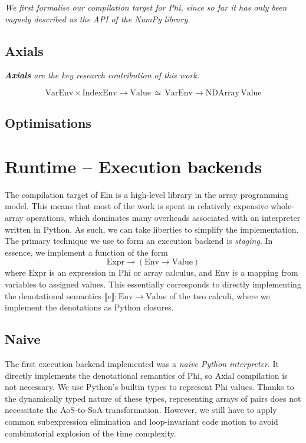 \textit{We first formalise our compilation target for Phi, since so far it has only been vaguely described as the API of the NumPy library.} \todothis

\subsection{Axials}

\textit{\textbf{Axials} are the key research contribution of this work.}

$$ \mathrm{VarEnv} \times \mathrm{IndexEnv} \to \mathrm{Value} \,\simeq\, \mathrm{VarEnv} \to \mathrm{NDArray}\, \mathrm{Value} $$

\todothis


\subsection{Optimisations}

\todothis

\section{Runtime -- Execution backends}
\label{execution-backend}

The compilation target of Ein is a high-level library in the array programming model. This means that most of the work is spent in relatively expensive whole-array operations, which dominates many overheads associated with an interpreter written in Python. As such, we can take liberties to simplify the implementation. The primary technique we use to form an execution backend is \textit{staging}. In essence, we implement a function of the form
$$ \mathrm{Expr} \to \left( \mathrm{Env} \to \mathrm{Value} \right) $$
where $\mathrm{Expr}$ is an expression in Phi or array calculus, and $\mathrm{Env}$ is a mapping from variables to assigned values. This essentially corresponds to directly implementing the denotational semantics $\llbracket e \rrbracket : \mathrm{Env} \to \mathrm{Value}$ of the two calculi, where we implement the denotations as Python closures.

\subsection{Naive}

The first execution backend implemented was a \textit{naive Python interpreter}. It directly implements the denotational semantics of Phi, so Axial compilation is not necessary. We use Python's builtin types to represent Phi values. Thanks to the dynamically typed nature of these types, representing arrays of pairs does not necessitate the AoS-to-SoA transformation. However, we still have to apply common subexpression elimination and loop-invariant code motion to avoid combinatorial explosion of the time complexity.

